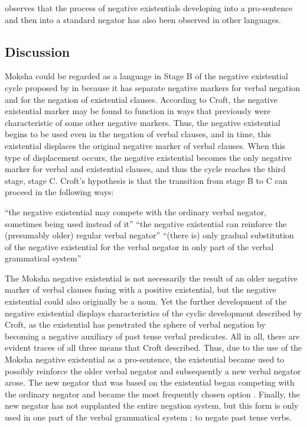 \documentclass[output=paper]{langsci/langscibook}
\begin{document}
\citet[127--133]{Veselinova2013} observes that the process of negative existentials developing into a pro-sentence and then into a standard negator has also been observed in other languages.

\subsection{Discussion}\label{sec:2:7.3}

Moksha could be regarded as a language in Stage B of the negative existential cycle proposed by in \citet{Croft1991} because it has separate negative markers for verbal negation and for the negation of existential clauses. According to Croft, the negative existential marker may be found to function in ways that previously were characteristic of some other negative markers. Thus,  the negative existential begins to be used even in the negation of verbal clauses, and in time, this existential displaces the original negative marker of verbal clauses. When this type of displacement occurs, the negative existential becomes the only negative marker for verbal and existential clauses, and thus the cycle reaches the third stage, stage C. Croft's hypothesis is that the transition from stage B to C can proceed in the following ways:
\begin{exe}[h]
 ``the negative existential may compete with the ordinary verbal negator, sometimes being used instead of it''
 ``the negative existential can reinforce the (presumably older) regular verbal negator''
 ``(there is) only gradual substitution of the negative existential for the verbal negator in only part of the verbal grammatical system''
\end{exe}

   The Moksha negative existential is not necessarily the result of an older negative marker of verbal clauses fusing with a positive existential, but the negative existential could also originally be a noun. Yet the further development of the negative existential displays characteristics of the cyclic development described by Croft, as the existential has penetrated the sphere of verbal negation by becoming a negative auxiliary of past tense verbal predicates. All in all, there are evident traces of all three means that Croft described. Thus, due to the use of the Moksha negative existential as a pro-sentence, the existential became used to possibly reinforce the older verbal negator  and subsequently a new verbal negator arose. The new negator that was based on the existential began competing with the ordinary negator and became the most frequently chosen option . Finally, the new negator has not supplanted the entire negation system, but this form is only used in one part of the verbal grammatical system : to negate past tense verbs. 
\end{document}
